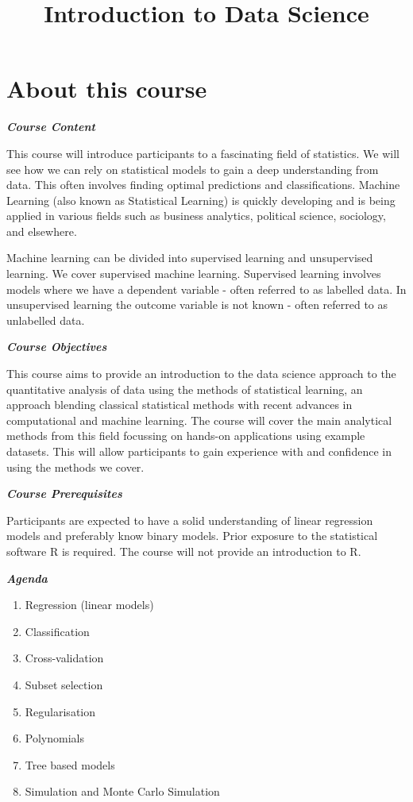 \documentclass[]{article}
\title{Introduction to Data Science}
\author{}
\date{}
\providecommand{\tightlist}{%
  \setlength{\itemsep}{0pt}\setlength{\parskip}{0pt}}
\begin{document}
\maketitle

{
\setcounter{tocdepth}{2}
\tableofcontents
}
\hypertarget{about-this-course}{%
\section*{About this course}\label{about-this-course}}

\textbf{\emph{Course Content}}

This course will introduce participants to a fascinating field of statistics. We will see how we can rely on statistical models to gain a deep understanding from data. This often involves finding optimal predictions and classifications. Machine Learning (also known as Statistical Learning) is quickly developing and is being applied in various fields such as business analytics, political science, sociology, and elsewhere.

Machine learning can be divided into supervised learning and unsupervised learning. We cover supervised machine learning. Supervised learning involves models where we have a dependent variable - often referred to as labelled data. In unsupervised learning the outcome variable is not known - often referred to as unlabelled data.

\textbf{\emph{Course Objectives}}

This course aims to provide an introduction to the data science approach to the quantitative analysis of data using the methods of statistical learning, an approach blending classical statistical methods with recent advances in computational and machine learning. The course will cover the main analytical methods from this field focussing on hands-on applications using example datasets. This will allow participants to gain experience with and confidence in using the methods we cover.

\textbf{\emph{Course Prerequisites}}

Participants are expected to have a solid understanding of linear regression models and preferably know binary models. Prior exposure to the statistical software R is required. The course will not provide an introduction to R.

\textbf{\emph{Agenda}}

\begin{enumerate}
\def\labelenumi{\arabic{enumi}.}
\tightlist
\item
  Regression (linear models)
\item
  Classification
\item
  Cross-validation
\item
  Subset selection
\item
  Regularisation
\item
  Polynomials
\item
  Tree based models
\item
  Simulation and Monte Carlo Simulation
\end{enumerate}
\end{document}
